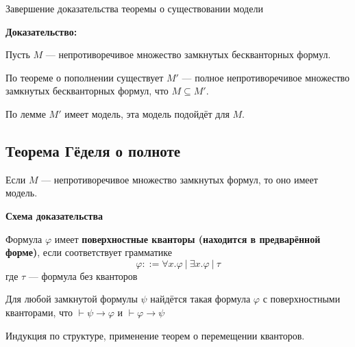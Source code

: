 Завершение доказательства теоремы о существовании модели

\textbf{Доказательство:}

Пусть $M$ --- непротиворечивое множество замкнутых бескванторных формул.

По теореме о пополнении существует $M'$ --- полное непротиворечивое множество замкнутых бескванторных формул,
что $M \subseteq M'$.

По лемме $M'$ имеет модель, эта модель подойдёт для $M$.

\subsection{Теорема Гёделя о полноте}


Если $M$ --- непротиворечивое множество замкнутых формул, то оно имеет модель.


\textbf{Схема доказательства}
\begin{center}
\end{center}


Формула $\varphi$ имеет \textbf{поверхностные кванторы (находится в предварённой форме)}, если
соответствует грамматике
$$\varphi ::= \forall x.\varphi\ |\ \exists x.\varphi\ |\ \tau$$
где $\tau$ --- формула без кванторов


Для любой замкнутой формулы $\psi$ найдётся такая формула $\varphi$ с поверхностными кванторами,
что $\vdash \psi\to\varphi$ и $\vdash\varphi\to\psi$

Индукция по структуре, применение теорем о перемещении кванторов.

